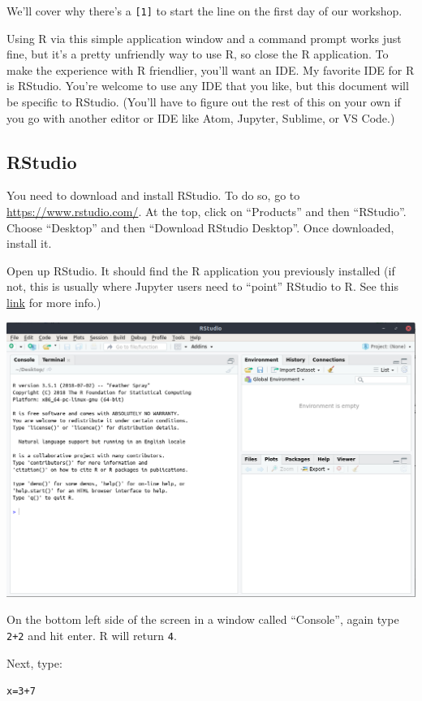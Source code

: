 \documentclass{article}\usepackage[]{graphicx}\usepackage[]{color}
\makeatletter
\newcommand{\hlnum}[1]{\textcolor[rgb]{0.686,0.059,0.569}{#1}}%
\newcommand{\hlopt}[1]{\textcolor[rgb]{0,0,0}{#1}}%
\newcommand{\hlstd}[1]{\textcolor[rgb]{0.345,0.345,0.345}{#1}}%
\newcommand{\hlkwb}[1]{\textcolor[rgb]{0.69,0.353,0.396}{#1}}%
\newenvironment{kframe}{%
 \def\at@end@of@kframe{}%
 \ifinner\ifhmode%
  \def\at@end@of@kframe{\end{minipage}}%
  \begin{minipage}{\columnwidth}%
 \fi\fi%
 \def\FrameCommand##1{\hskip\@totalleftmargin \hskip-\fboxsep
 \colorbox{shadecolor}{##1}\hskip-\fboxsep
     \hskip-\linewidth \hskip-\@totalleftmargin \hskip\columnwidth}%
 \MakeFramed {\advance\hsize-\width
   \@totalleftmargin\z@ \linewidth\hsize
   \@setminipage}}%
 {\par\unskip\endMakeFramed%
 \at@end@of@kframe}
\newenvironment{knitrout}{}{} %
\makeatother
\begin{document}
We'll cover why there's a \texttt{[1]} to start the line on the first day of our workshop.

Using R via this simple application window and a command prompt works just fine, but it's a pretty unfriendly way to use R, so close the R application. To make the experience with R friendlier, you'll want an IDE. My favorite IDE for R is RStudio. You're welcome to use any IDE that you like, but this document will be specific to RStudio. (You'll have to figure out the rest of this on your own if you go with another editor or IDE like Atom, Jupyter, Sublime, or VS Code.)

\subsection*{RStudio} %

You need to download and install RStudio. To do so, go to \url{https://www.rstudio.com/}. At the top, click on ``Products'' and then ``RStudio''. Choose ``Desktop'' and then ``Download RStudio Desktop''. Once downloaded, install it.

Open up RStudio. It should find the R application you previously installed (if not, this is usually where Jupyter users need to ``point'' RStudio to R. See this \href{https://support.rstudio.com/hc/en-us/articles/200486138-Changing-R-versions-for-RStudio-desktop}{link} for more info.) 

\begin{center}
  \includegraphics[width=0.5\linewidth,keepaspectratio]{rstudio_screenshot.png}
\end{center}

On the bottom left side of the screen in a window called ``Console'', again type \texttt{2+2} and hit enter. R will return \texttt{4}. 

Next, type:

\begin{knitrout}
\color{fgcolor}\begin{kframe}
\begin{alltt}
\hlstd{x} \hlkwb{=} \hlnum{3}\hlopt{+}\hlnum{7}
\end{alltt}
\end{kframe}
\end{knitrout}
\end{document}
